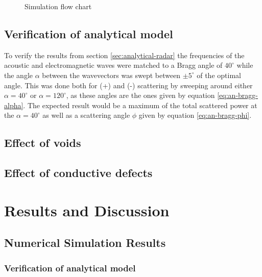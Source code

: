 \documentclass[11pt,twoside]{eitExjobb}
\begin{document}
	\begin{figure}[h]
		\centering
		\resizebox{\textwidth}{!}{
			
		}
		\caption{\label{fig:simulationflow} Simulation flow chart}
	\end{figure}
	
	\section{Verification of analytical model}
	To verify the results from section \ref{sec:analytical-radar} the frequencies of the acoustic and electromagnetic waves were matched to a Bragg angle of $40^\circ$ while the angle $\alpha$ between the wavevectors was swept between $\pm 5^\circ$ of the optimal angle. This was done both for (+) and (-) scattering by sweeping around either $\alpha = 40^\circ$ or $\alpha = 120^\circ$, as these angles are the ones given by equation \eqref{eq:an-bragg-alpha}. The expected result would be a maximum of the total scattered power at the $\alpha = 40^\circ$ as well as a scattering angle $\phi$ given by equation \eqref{eq:an-bragg-phi}.
	
	\section{Effect of voids}
	
	\section{Effect of conductive defects}
	
	\chapter{Results and Discussion}
	
	\section{Numerical Simulation Results}
	
	\subsection{Verification of analytical model}
	
\end{document}
